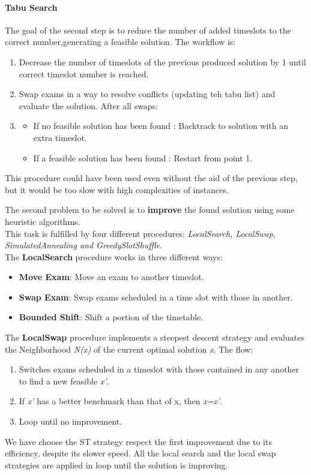 \documentclass[12pt]{article}
\begin{document}
\paragraph{Tabu Search} The goal of the second step is to reduce the number of added timeslots to the correct number,generating a feasible solution.
The workflow is:
\begin{enumerate}
  \item Decrease the number of timeslots of the previous produced solution by 1 until correct timeslot number is reached.
  \item Swap exams in a way to resolve conflicts (updating teh tabu list) and evaluate the solution.
  After all swaps:
  \item \begin{itemize}
    \item If no feasible solution has been found : Backtrack to solution with an extra timeslot.
    \item If a feasible solution has been found : Restart from point 1.
  \end{itemize}
\end{enumerate}
This procedure could have been used even without the aid of the previous step, but it would be too slow with high complexities of instances.

The second problem to be solved is to \textbf{improve} the found solution using some heuristic algorithms.\\
This task is fulfilled by four different procedures: \textit{LocalSearch, LocalSwap, SimulatedAnnealing and GreedySlotShuffle}.\\

The \textbf{LocalSearch} procedure works in three different ways:
\begin{itemize}
  \item \textbf{Move Exam}: Move an exam to another timeslot.
  \item \textbf{Swap Exam}: Swap exams scheduled in a time slot with those in another.
  \item \textbf{Bounded Shift}: Shift a portion of the timetable.
\end{itemize}

The \textbf{LocalSwap} procedure implements a steepest descent strategy and evaluates the Neighborhood \textit{N(x)} of the current optimal solution \textit{x}. The flow:
\begin{enumerate}
  \item Switches exams scheduled in a timeslot with those contained in any another to find a new feasible \textit{x'}.
  \item If \textit{x'} has a better benchmark than that of x, then \textit{x=x'}.
  \item Loop until no improvement.
\end{enumerate}
We have choose the ST strategy respect the first improvement due to its efficiency, despite its slower speed. All the local search and the local swap strategies are applied in loop until the solution is improving.\\
\end{document}
